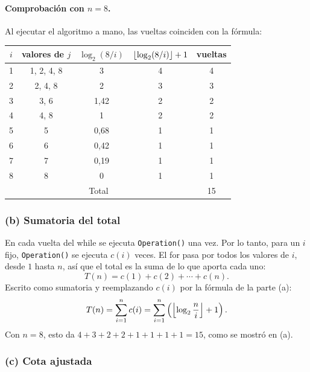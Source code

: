 \noindent\begin{minipage}{\linewidth}
\paragraph{Comprobación con $n = 8$.}
Al ejecutar el algoritmo a mano, las vueltas coinciden con la fórmula:
\begin{center}
\begin{tabular}{ccccc}
  \toprule
  $i$ & valores de $j$ & $\log_2(8/i)$ & $\floor{\log_2(8/i)} + 1$ & vueltas \\
  \midrule
  1 & 1, 2, 4, 8 & 3      & 4 & 4 \\
  2 & 2, 4, 8    & 2      & 3 & 3 \\
  3 & 3, 6       & 1,42   & 2 & 2 \\
  4 & 4, 8       & 1      & 2 & 2 \\
  5 & 5          & 0,68   & 1 & 1 \\
  6 & 6          & 0,42   & 1 & 1 \\
  7 & 7          & 0,19   & 1 & 1 \\
  8 & 8          & 0      & 1 & 1 \\
  \midrule
  \multicolumn{4}{c}{Total} & 15 \\
  \bottomrule
\end{tabular}
\end{center}
\end{minipage}

\subsubsection*{(b) Sumatoria del total}

En cada vuelta del while se ejecuta \texttt{Operation()} una vez. Por lo tanto, para un
$i$ fijo, \texttt{Operation()} se ejecuta $c(i)$ veces. El for pasa por todos los valores
de $i$, desde $1$ hasta $n$, así que el total es la suma de lo que aporta cada uno:
\[
  T(n) = c(1) + c(2) + \cdots + c(n).
\]
Escrito como sumatoria y reemplazando $c(i)$ por la fórmula de la parte (a):
\[
  T(n) = \sum_{i=1}^{n} c(i) = \sum_{i=1}^{n} \left( \floor*{\log_2 \frac{n}{i}} + 1 \right).
\]
Con $n = 8$, esto da $4 + 3 + 2 + 2 + 1 + 1 + 1 + 1 = 15$, como se mostró en (a).

\subsubsection*{(c) Cota ajustada}

